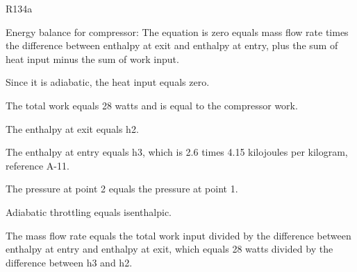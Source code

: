 R134a

Energy balance for compressor:
The equation is zero equals mass flow rate times the difference between enthalpy at exit and enthalpy at entry, plus the sum of heat input minus the sum of work input.

Since it is adiabatic, the heat input equals zero.

The total work equals 28 watts and is equal to the compressor work.

The enthalpy at exit equals h2.

The enthalpy at entry equals h3, which is 2.6 times 4.15 kilojoules per kilogram, reference A-11.

The pressure at point 2 equals the pressure at point 1.

Adiabatic throttling equals isenthalpic.

The mass flow rate equals the total work input divided by the difference between enthalpy at entry and enthalpy at exit, which equals 28 watts divided by the difference between h3 and h2.